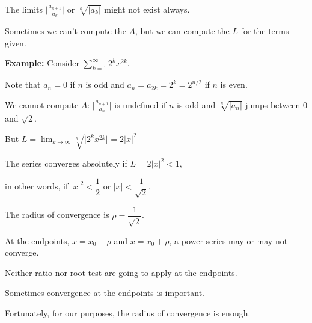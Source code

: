 \documentclass[10pt,aspectratio=169]{beamer}
\begin{document}
\begin{frame}
The limits
$\bigl \lvert \frac{a_{k+1}}{a_k} \bigr \rvert$
or
$\sqrt[k]{\lvert a_k \rvert}$
might not exist always.

\pause
\medskip

Sometimes we can't compute the $A$, but we can compute the
$L$ for the terms given.

\pause
\medskip

\textbf{Example:}
Consider \quad
$\displaystyle \sum_{k=1}^\infty 2^k x^{2k}$.

\pause
\medskip

Note that $a_n = 0$ if $n$ is odd and $a_n = a_{2k} = 2^k = 2^{n/2}$
if $n$ is even.

\medskip
\pause

We cannot compute $A$:
$\bigl \lvert \frac{a_{n+1}}{a_n} \bigr \rvert$
is undefined if $n$ is odd and
$\sqrt[n]{\lvert a_n \rvert}$ jumps between $0$
and $\sqrt{2}$.

\pause
\medskip

But
\quad
$\displaystyle
L = \lim_{k\to \infty}
\sqrt[k]{\lvert 2^k x^{2k} \rvert}
= 2 {\lvert x\rvert}^2$

\pause
\medskip

The series converges absolutely if \quad
$L = 2 {\lvert x\rvert}^2 < 1$,

\pause
\medskip

in other words, if
\quad ${\lvert x\rvert}^2 < \dfrac{1}{2}$
\quad
or
\quad ${\lvert x\rvert} < \dfrac{1}{\sqrt{2}}$.

\pause
\medskip

The radius of convergence is $\rho = \dfrac{1}{\sqrt{2}}$.

\end{frame}

\begin{frame}

At the endpoints,
$x = x_0-\rho$ and $x = x_0+\rho$,
a power series may or may not converge.

\pause
\medskip

Neither ratio nor root test are going to apply at the
endpoints.

\pause
\medskip

Sometimes convergence at the endpoints is important.

\pause
\medskip

Fortunately, for our purposes, the radius of convergence is enough.

\end{frame}
\end{document}

